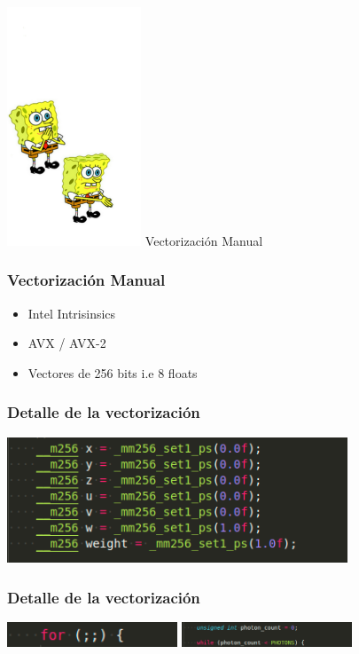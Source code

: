 \documentclass{beamer}
\begin{document}
\begin{frame}
    \includegraphics[width=4cm]{imagenes/spongebobmeme.jpg} 
    Vectorización Manual
\end{frame}

\begin{frame}
    \frametitle{Vectorización Manual}
    \begin{itemize}
        \item Intel Intrisinsics \pause
        \item AVX / AVX-2 \pause
        \item Vectores de 256 bits i.e 8 floats
    \end{itemize}
\end{frame}

\begin{frame}
    \frametitle{Detalle de la vectorización}
    \includegraphics[width=4in]{imagenes/det_vec1.png}
\end{frame}

\begin{frame}
    \frametitle{Detalle de la vectorización}
    \includegraphics[width=2in]{imagenes/comp_vec2.png} \pause
    \includegraphics[width=2in]{imagenes/det_vec2.png}
\end{frame}
\end{document}

